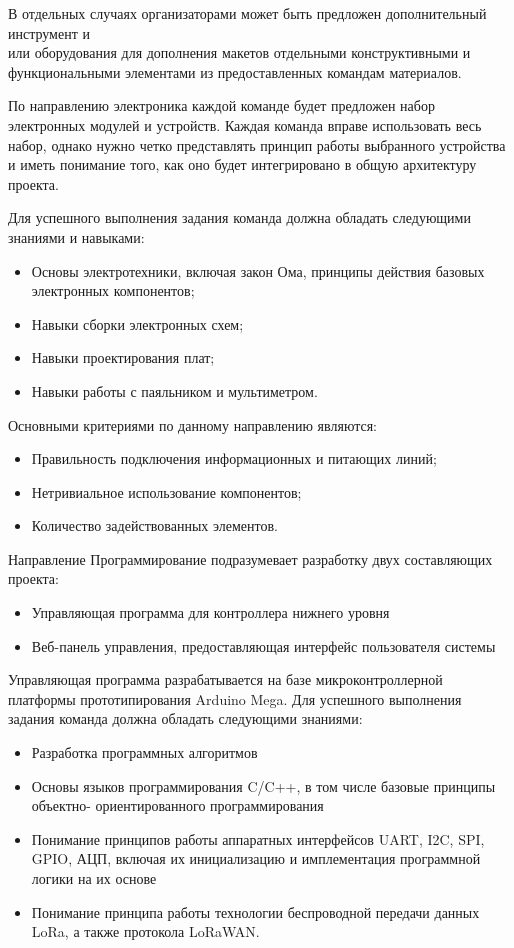 В отдельных случаях организаторами может быть предложен дополнительный инструмент и\\или оборудования для дополнения макетов отдельными конструктивными и функциональными элементами из предоставленных командам материалов.

По направлению электроника каждой команде будет предложен набор электронных модулей и устройств. Каждая команда вправе использовать весь набор, однако нужно четко представлять принцип работы выбранного устройства и иметь понимание того, как оно будет интегрировано в общую архитектуру проекта.

Для успешного выполнения задания команда должна обладать следующими знаниями и навыками:

\begin{itemize}
    \item Основы электротехники, включая закон Ома, принципы действия базовых электронных компонентов;
    \item Навыки сборки электронных схем;
    \item Навыки проектирования плат;
    \item Навыки работы с паяльником и мультиметром.
\end{itemize}

Основными критериями по данному направлению являются:

\begin{itemize}
    \item Правильность подключения информационных и питающих линий;
    \item Нетривиальное использование компонентов;
    \item Количество задействованных элементов.
\end{itemize}

Направление Программирование подразумевает разработку двух составляющих проекта:

\begin{itemize}
    \item Управляющая программа для контроллера нижнего уровня
    \item Веб-панель управления, предоставляющая интерфейс пользователя системы        
\end{itemize}

Управляющая программа разрабатывается на базе микроконтроллерной платформы прототипирования Arduino Mega. Для успешного выполнения задания команда должна обладать следующими знаниями:

\begin{itemize}
    \item Разработка программных алгоритмов
    \item Основы языков программирования C/C++, в том числе базовые принципы объектно- ориентированного программирования
    \item Понимание принципов работы аппаратных интерфейсов UART, I2C, SPI, GPIO, АЦП, включая их инициализацию и имплементация программной логики на их основе
    \item Понимание принципа работы технологии беспроводной передачи данных LoRa, а также протокола LoRaWAN.
\end{itemize}

